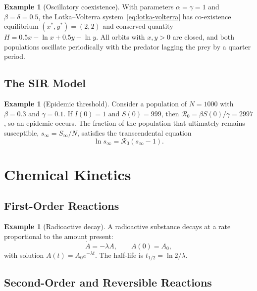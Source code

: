 \documentclass[12pt,a4paper,openany]{book}
\theoremstyle{definition}
\newtheorem{example}[definition]{Example}
\theoremstyle{plain}
\theoremstyle{remark}
\begin{document}
\begin{example}[Oscillatory coexistence]
\label{ex:lv-oscillations}
With parameters $\alpha=\gamma=1$ and $\beta=\delta=0.5$, the
Lotka--Volterra system~\eqref{eq:lotka-volterra} has co-existence
equilibrium $(x^{*},y^{*})=(2,2)$ and conserved quantity
$H=0.5x-\ln x+0.5y-\ln y$. All orbits with $x,y>0$ are closed, and
both populations oscillate periodically with the predator lagging the
prey by a quarter period.
\end{example}

\subsection{The SIR Model}
\label{subsec:sir-app}

\begin{example}[Epidemic threshold]
\label{ex:sir-threshold}
Consider a population of $N=1000$ with $\beta=0.3$ and
$\gamma=0.1$. If $I(0)=1$ and $S(0)=999$, then
$\mathcal{R}_{0}=\beta S(0)/\gamma = 2997$, so an epidemic occurs.
The fraction of the population that ultimately remains susceptible,
$s_{\infty}=S_{\infty}/N$, satisfies the transcendental equation
\[
  \ln s_{\infty} = \mathcal{R}_{0}(s_{\infty}-1).
\]
\end{example}

\section{Chemical Kinetics}
\label{sec:chemical-kinetics}

\subsection{First-Order Reactions}
\label{subsec:first-order-reaction}

\begin{example}[Radioactive decay]
\label{ex:radioactive-decay}
A radioactive substance decays at a rate proportional to the amount
present:
\[
  \dot{A} = -\lambda A, \qquad A(0)=A_{0},
\]
with solution $A(t)=A_{0}e^{-\lambda t}$. The half-life is
$t_{1/2}=\ln 2/\lambda$.
\end{example}

\subsection{Second-Order and Reversible Reactions}
\label{subsec:second-order-reaction}
\end{document}
